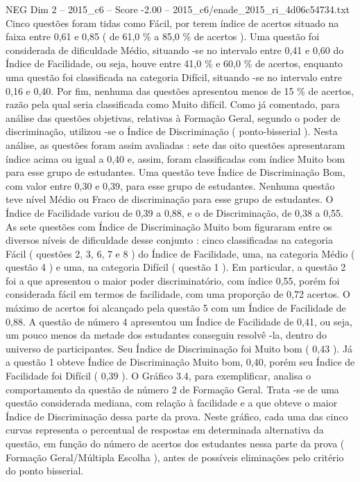\begin{textsample}{NEG Dim 2 – 2015\_c6 – Score -2.00 – 2015\_c6/enade\_2015\_ri\_4d06c54734.txt}
Cinco questões foram tidas como Fácil, por terem índice de acertos situado na faixa entre 0,61 e 0,85 ( de 61,0 \% a 85,0 \% de acertos ).
Uma questão foi considerada de dificuldade Médio, situando -se no intervalo entre 0,41 e 0,60 do Índice de Facilidade, ou seja, houve entre 41,0 \% e 60,0 \% de acertos, enquanto uma questão foi classificada na categoria Difícil, situando -se no intervalo entre 0,16 e 0,40.
Por fim, nenhuma das questões apresentou menos de 15 \% de acertos, razão pela qual seria classificada como Muito difícil.
Como já comentado, para análise das questões objetivas, relativas à Formação Geral, segundo o poder de discriminação, utilizou -se o Índice de Discriminação ( ponto-bisserial ).
Nesta análise, as questões foram assim avaliadas : sete das oito questões apresentaram índice acima ou igual a 0,40 e, assim, foram classificadas com índice Muito bom para esse grupo de estudantes.
Uma questão teve Índice de Discriminação Bom, com valor entre 0,30 e 0,39, para esse grupo de estudantes.
Nenhuma questão teve nível Médio ou Fraco de discriminação para esse grupo de estudantes.
O Índice de Facilidade variou de 0,39 a 0,88, e o de Discriminação, de 0,38 a 0,55.
As sete questões com Índice de Discriminação Muito bom figuraram entre os diversos níveis de dificuldade desse conjunto : cinco classificadas na categoria Fácil ( questões 2, 3, 6, 7 e 8 ) do Índice de Facilidade, uma, na categoria Médio ( questão 4 ) e uma, na categoria Difícil ( questão 1 ).
Em particular, a questão 2 foi a que apresentou o maior poder discriminatório, com índice 0,55, porém foi considerada fácil em termos de facilidade, com uma proporção de 0,72 acertos.
O máximo de acertos foi alcançado pela questão 5 com um Índice de Facilidade de 0,88.
A questão de número 4 apresentou um Índice de Facilidade de 0,41, ou seja, um pouco menos da metade dos estudantes conseguiu resolvê -la, dentro do universo de participantes.
Seu Índice de Discriminação foi Muito bom ( 0,43 ).
Já a questão 1 obteve Índice de Discriminação Muito bom, 0,40, porém seu Índice de Facilidade foi Difícil ( 0,39 ).
O Gráfico 3.4, para exemplificar, analisa o comportamento da questão de número 2 de Formação Geral.
Trata -se de uma questão considerada mediana, com relação à facilidade e a que obteve o maior Índice de Discriminação dessa parte da prova.
Neste gráfico, cada uma das cinco curvas representa o percentual de respostas em determinada alternativa da questão, em função do número de acertos dos estudantes nessa parte da prova ( Formação Geral/Múltipla Escolha ), antes de possíveis eliminações pelo critério do ponto bisserial.

\end{textsample}
